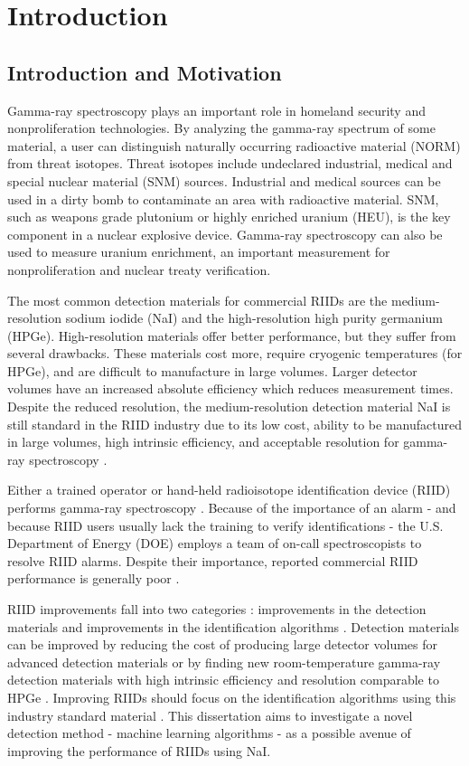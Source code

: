 \chapter{Introduction}

\section{Introduction and Motivation}

Gamma-ray spectroscopy plays an important role in homeland security and nonproliferation technologies. By analyzing the gamma-ray spectrum of some material, a user can distinguish naturally occurring radioactive material (NORM) from threat isotopes. Threat isotopes include undeclared industrial, medical and special nuclear material (SNM) sources. Industrial and medical sources can be used in a dirty bomb to contaminate an area with radioactive material. SNM, such as weapons grade plutonium or highly enriched uranium (HEU), is the key component in a nuclear explosive device. Gamma-ray spectroscopy can also be used to measure uranium enrichment, an important measurement for nonproliferation and nuclear treaty verification. 

The most common detection materials for commercial RIIDs are the medium-resolution sodium iodide (NaI) and the high-resolution high purity germanium (HPGe). High-resolution materials offer better performance, but they suffer from several drawbacks. These materials cost more, require cryogenic temperatures (for HPGe), and are difficult to manufacture in large volumes. Larger detector volumes have an increased absolute efficiency which reduces measurement times. Despite the reduced resolution, the medium-resolution detection material NaI is still standard in the RIID industry due to its low cost, ability to be manufactured in large volumes, high intrinsic efficiency, and acceptable resolution for gamma-ray spectroscopy \cite{swoboda2004}.

Either a trained operator or hand-held radioisotope identification device (RIID) performs gamma-ray spectroscopy \cite{burr2009}. Because of the importance of an alarm - and because RIID users usually lack the training to verify identifications - the U.S. Department of Energy (DOE) employs a team of on-call spectroscopists to resolve RIID alarms. Despite their importance, reported commercial RIID performance is generally poor \cite{pibida2004,blackadar2003,blackadar2004}.

RIID improvements fall into two categories \cite{swoboda2004}: improvements in the detection materials and improvements in the identification algorithms \cite{blackadar2003}. Detection materials can be improved by reducing the cost of producing large detector volumes for advanced detection materials \cite{Gostilo2004,Chen2018} or by finding new room-temperature gamma-ray detection materials with high intrinsic efficiency and resolution comparable to HPGe \cite{swoboda2004}. Improving RIIDs should focus on the identification algorithms using this industry standard material \cite{blackadar2003}. This dissertation aims to investigate a novel detection method - machine learning algorithms - as a possible avenue of improving the performance of RIIDs using NaI.

